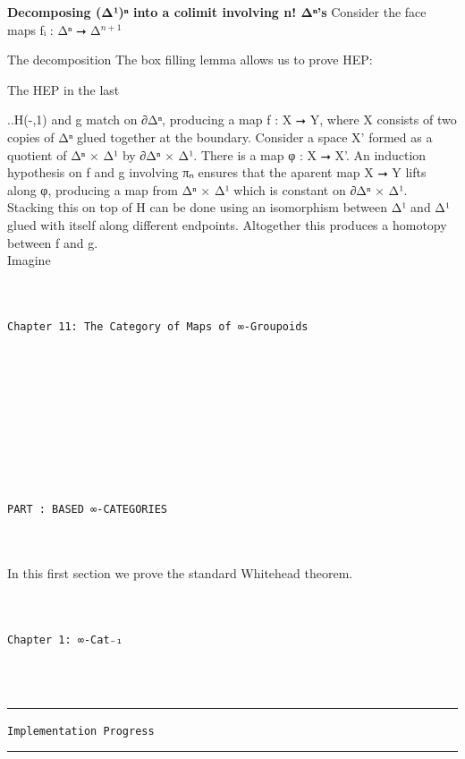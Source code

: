 \documentclass{book}
\theoremstyle{definition}
\newcounter{pcounter}
\renewcommand{\chapter}[1]{
\newpage
{
\Huge 
\begin{center}
\ \\
\ \\
\thispagestyle{empty}
\texttt{#1}
\end{center}}
\ \\
\ \\
}
\newcounter{partcount}
\renewcommand{\part}[1]{
\newpage
{
\Huge 
\begin{center}
\ \\
\ \\
\ \\
\ \\
\ \\
\ \\
\thispagestyle{empty}
\texttt{PART {\thepartcount}: #1}
\stepcounter{partcount}
\end{center}}
\ \\
\ \\
}
\begin{document}
{\bf Decomposing (Δ¹)ⁿ into a colimit involving n! Δⁿ's} Consider the face maps fᵢ : Δⁿ ⭢ Δ${}^{n+1}$


The decomposition 
The box filling lemma allows us to prove HEP:


The HEP in the last 

..H(-,1) and g match on ∂Δⁿ, producing a map f : X ⭢ Y, where X consists of two copies of Δⁿ glued together at the boundary. Consider a space X' formed as a quotient of Δⁿ × Δ¹ by ∂Δⁿ × Δ¹. There is a map φ : X ⭢ X'. An induction hypothesis on f and g involving πₙ ensures that the aparent map X ⭢ Y lifts along φ, producing a map from Δⁿ × Δ¹ which is constant on ∂Δⁿ × Δ¹. Stacking this on top of H can be done using an isomorphism between Δ¹ and Δ¹ glued with itself along different endpoints. Altogether this produces a homotopy between f and g.\\

Imagine 




\chapter{Chapter 11: The Category of Maps of ∞-Groupoids}








\part{BASED ∞-CATEGORIES}

In this first section we prove the standard Whitehead theorem.\\


\chapter{Chapter 1: ∞\texttt{-Cat₋₁}}


\noindent\textcolor{Red}{\rule{16cm}{1mm}}
\begin{center}
\texttt{Implementation Progress}
\end{center}
\noindent\textcolor{Red}{\rule{16cm}{1mm}}
\end{document}
